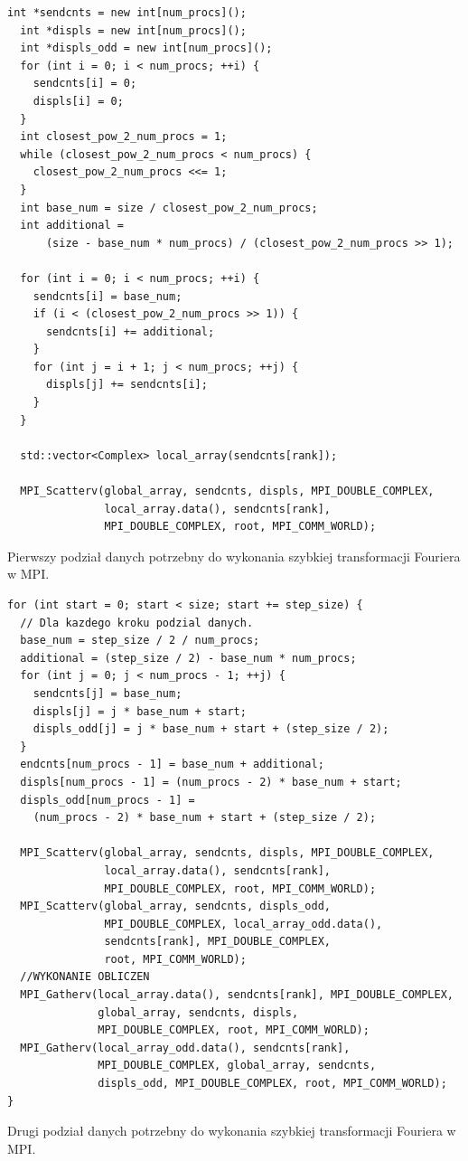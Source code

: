 \documentclass[a4paper,12pt]{book} %
\begin{document}
\begin{lstfloat}
\lstset{language=C++}
\begin{lstlisting}[frame=single]
  int *sendcnts = new int[num_procs]();
  int *displs = new int[num_procs]();
  int *displs_odd = new int[num_procs]();
  for (int i = 0; i < num_procs; ++i) {
    sendcnts[i] = 0;
    displs[i] = 0;
  }
  int closest_pow_2_num_procs = 1;
  while (closest_pow_2_num_procs < num_procs) {
    closest_pow_2_num_procs <<= 1;
  }
  int base_num = size / closest_pow_2_num_procs;
  int additional =
      (size - base_num * num_procs) / (closest_pow_2_num_procs >> 1);

  for (int i = 0; i < num_procs; ++i) {
    sendcnts[i] = base_num;
    if (i < (closest_pow_2_num_procs >> 1)) {
      sendcnts[i] += additional;
    }
    for (int j = i + 1; j < num_procs; ++j) {
      displs[j] += sendcnts[i];
    }
  }

  std::vector<Complex> local_array(sendcnts[rank]);

  MPI_Scatterv(global_array, sendcnts, displs, MPI_DOUBLE_COMPLEX,
               local_array.data(), sendcnts[rank],
               MPI_DOUBLE_COMPLEX, root, MPI_COMM_WORLD);
\end{lstlisting}
\caption{Pierwszy podział danych potrzebny do wykonania szybkiej transformacji Fouriera w MPI.}
\label{lst:mpi-data-split}
\end{lstfloat}

\begin{lstfloat}
\lstset{language=C++}
\begin{lstlisting}[frame=single]
for (int start = 0; start < size; start += step_size) {
  // Dla kazdego kroku podzial danych.
  base_num = step_size / 2 / num_procs;
  additional = (step_size / 2) - base_num * num_procs;
  for (int j = 0; j < num_procs - 1; ++j) {
    sendcnts[j] = base_num;
    displs[j] = j * base_num + start;
    displs_odd[j] = j * base_num + start + (step_size / 2);
  }
  endcnts[num_procs - 1] = base_num + additional;
  displs[num_procs - 1] = (num_procs - 2) * base_num + start;
  displs_odd[num_procs - 1] =
    (num_procs - 2) * base_num + start + (step_size / 2);

  MPI_Scatterv(global_array, sendcnts, displs, MPI_DOUBLE_COMPLEX,
               local_array.data(), sendcnts[rank], 
               MPI_DOUBLE_COMPLEX, root, MPI_COMM_WORLD);
  MPI_Scatterv(global_array, sendcnts, displs_odd, 
  			   MPI_DOUBLE_COMPLEX, local_array_odd.data(),
  			   sendcnts[rank], MPI_DOUBLE_COMPLEX,
               root, MPI_COMM_WORLD);
  //WYKONANIE OBLICZEN
  MPI_Gatherv(local_array.data(), sendcnts[rank], MPI_DOUBLE_COMPLEX,
              global_array, sendcnts, displs, 
              MPI_DOUBLE_COMPLEX, root, MPI_COMM_WORLD);
  MPI_Gatherv(local_array_odd.data(), sendcnts[rank], 
  			  MPI_DOUBLE_COMPLEX, global_array, sendcnts, 
  			  displs_odd, MPI_DOUBLE_COMPLEX, root, MPI_COMM_WORLD);
}

\end{lstlisting}
\caption{Drugi podział danych potrzebny do wykonania szybkiej transformacji Fouriera w MPI.}
\label{lst:mpi-data-split2}
\end{lstfloat}
\end{document}
